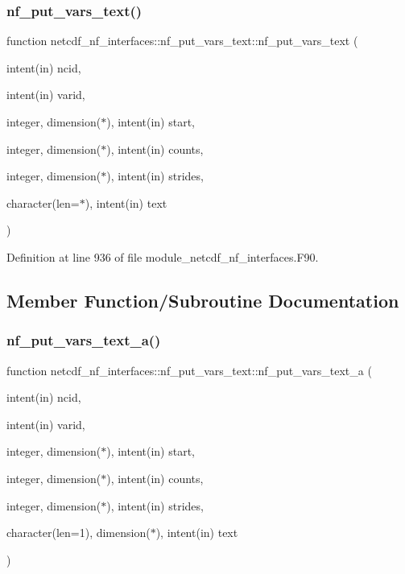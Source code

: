 \subsubsection{\texorpdfstring{nf\+\_\+put\+\_\+vars\+\_\+text()}{nf\_put\_vars\_text()}}
{\footnotesize\ttfamily function netcdf\+\_\+nf\+\_\+interfaces\+::nf\+\_\+put\+\_\+vars\+\_\+text\+::nf\+\_\+put\+\_\+vars\+\_\+text (\begin{DoxyParamCaption}\item[{intent(in)}]{ncid,  }\item[{intent(in)}]{varid,  }\item[{integer, dimension($\ast$), intent(in)}]{start,  }\item[{integer, dimension($\ast$), intent(in)}]{counts,  }\item[{integer, dimension($\ast$), intent(in)}]{strides,  }\item[{character(len=$\ast$), intent(in)}]{text }\end{DoxyParamCaption})}



Definition at line 936 of file module\+\_\+netcdf\+\_\+nf\+\_\+interfaces.\+F90.



\subsection{Member Function/\+Subroutine Documentation}
\mbox{\label{interfacenetcdf__nf__interfaces_1_1nf__put__vars__text_aba67f9140ae2f7a18a21ea3c60c45bb6}} 
\subsubsection{\texorpdfstring{nf\+\_\+put\+\_\+vars\+\_\+text\+\_\+a()}{nf\_put\_vars\_text\_a()}}
{\footnotesize\ttfamily function netcdf\+\_\+nf\+\_\+interfaces\+::nf\+\_\+put\+\_\+vars\+\_\+text\+::nf\+\_\+put\+\_\+vars\+\_\+text\+\_\+a (\begin{DoxyParamCaption}\item[{intent(in)}]{ncid,  }\item[{intent(in)}]{varid,  }\item[{integer, dimension($\ast$), intent(in)}]{start,  }\item[{integer, dimension($\ast$), intent(in)}]{counts,  }\item[{integer, dimension($\ast$), intent(in)}]{strides,  }\item[{character(len=1), dimension($\ast$), intent(in)}]{text }\end{DoxyParamCaption})}



